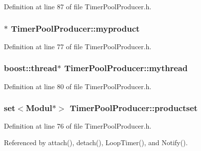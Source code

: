 \-Definition at line 87 of file \-Timer\-Pool\-Producer.\-h.

\hypertarget{classTimerPoolProducer_ad592323c1d91c4a8e05d44f71b84dfe4}{
\subsubsection[{myproduct}]{$\ast$ {\bf \-Timer\-Pool\-Producer\-::myproduct}}}\label{classTimerPoolProducer_ad592323c1d91c4a8e05d44f71b84dfe4}


\-Definition at line 77 of file \-Timer\-Pool\-Producer.\-h.

\hypertarget{classTimerPoolProducer_a769349d783a28489a9a2fa5809bb3e1c}{
\subsubsection[{mythread}]{\setlength{\rightskip}{0pt plus 5cm}boost\-::thread$\ast$ {\bf \-Timer\-Pool\-Producer\-::mythread}}}\label{classTimerPoolProducer_a769349d783a28489a9a2fa5809bb3e1c}


\-Definition at line 80 of file \-Timer\-Pool\-Producer.\-h.

\hypertarget{classTimerPoolProducer_a8f115a7a158c1a87b7c0b69979056a58}{
\subsubsection[{productset}]{\setlength{\rightskip}{0pt plus 5cm}set$<${\bf \-Modul}$\ast$$>$ {\bf \-Timer\-Pool\-Producer\-::productset}}}\label{classTimerPoolProducer_a8f115a7a158c1a87b7c0b69979056a58}


\-Definition at line 76 of file \-Timer\-Pool\-Producer.\-h.



\-Referenced by attach(), detach(), \-Loop\-Timer(), and \-Notify().

